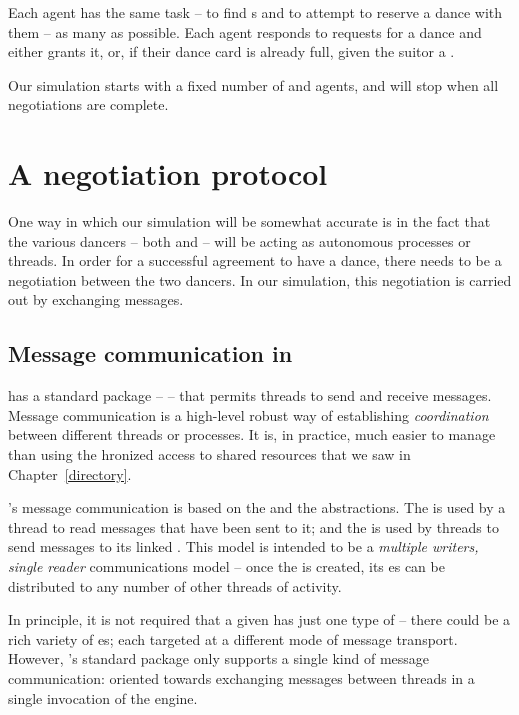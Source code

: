 Each \mail agent has the same task -- to find \phemail{}s and to attempt to reserve a dance with them -- as many as possible. Each \phemail agent responds to requests for a dance and either grants it, or, if their dance card is already full, given the suitor a .

Our simulation starts with a fixed number of \mail and \phemail agents, and will stop when all negotiations are complete.

\section{A negotiation protocol}
\label{dance:proto}

One way in which our simulation will be somewhat accurate is in the fact that the various dancers -- both \mail and \phemail -- will be acting as autonomous processes or threads. In order for a successful agreement to have a dance, there needs to be a negotiation between the two dancers. In our simulation, this negotiation is carried out by exchanging messages.

\subsection{Message communication in \go}
\label{dance:mbox}

\go has a standard package --  -- that permits threads to send and receive messages. Message communication is a high-level robust way of establishing \emph{coordination} between different threads or processes. It is, in practice, much easier to manage than using the hronized access to shared resources that we saw in Chapter~\ref{directory}.

\go's message communication is based on the  and the  abstractions. The  is used by a thread to read messages that have been sent to it; and the  is used by threads to send messages to its linked . This model is intended to be a \emph{multiple writers, single reader} communications model -- once the  is created, its es can be distributed to any number of other threads of activity.

\begin{aside}
In principle, it is not required that a given  has just one type of  -- there could be a rich variety of es; each targeted at a different mode of message transport. However, \go's standard  package only supports a single kind of message communication: oriented towards exchanging messages between threads in a single invocation of the \go engine.
\end{aside}

